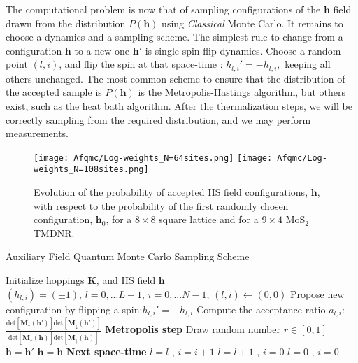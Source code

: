 The computational problem is now that of sampling configurations of the $\bm h$ field drawn from the distribution $P(\bm h)$ using \emph{Classical} Monte Carlo.
It remains to choose a dynamics and a sampling scheme. The simplest rule to change from a configuration $\bm h$ to a new one $\bm h'$ is single spin-flip dynamics. 
Choose a random point $(l, i)$, and flip the spin at that space-time  :
$
h_{l, i}' = - h_{l, i},
$
keeping all others unchanged.
The most common scheme to ensure that the distribution of the accepted sample is $P(\bm h)$ is the Metropolis-Hastings algorithm, but others exist, such as the heat bath algorithm.
After the thermalization steps, we will be correctly sampling from the required distribution, and we may perform measurements.
\begin{figure}[H]\label{fig:convergence}
\hspace{0.3cm}
\texttt{[image: Afqmc/Log-weights\_N=64sites.png]}
\hspace{0.3cm}
\texttt{[image: Afqmc/Log-weights\_N=108sites.png]}
\caption[Evolution of the probability of accepted configurations.]{Evolution of the probability of accepted HS field configurations, $\bm h$, with respect to the probability of the first randomly chosen configuration, $\bm h_0$, for a $8 \times 8$ square lattice and for a $9 \times 4$ $\text{Mo}\text{S}_2$ \acs{TMDNR}.}
\end{figure}
\begin{algorithm}
\caption{Auxiliary Field Quantum Monte Carlo Sampling Scheme}
\label{afqmcSampling}
\begin{algorithmic}[5]
  \STATE Initialize hoppings $\bm K$, and  HS field $\bm h$  \\
  \STATE  $(h_{l, i}) = (\pm 1)$, $ l=0,... L-1$, $i = 0, ... N-1$; $(l, i) \leftarrow (0, 0)$
  \STATE \footnotesize{Propose new configuration by flipping a spin:}\normalsize{$h_{l, i}' = - h_{l, i}$} 
  \STATE \footnotesize{Compute the acceptance ratio $a_{l, i}$}:
  \normalsize{$\frac{\text{det}[\bm M_\uparrow (\bm h')]\text{det}[\bm M_\downarrow (\bm h')]}{\text{det}[\bm M_\uparrow (\bm h)]\text{det}[\bm M_\downarrow (\bm h)]}$}
  \STATE \textbf{\normalsize{Metropolis step}}
  \STATE \footnotesize{Draw random number $r \in [0,1]$}
  \STATE $\bm h = \bm h'$
  \ELSE
  \STATE $\bm h = \bm h$
  \ENDIF
  \STATE \textbf{Next space-time }
  \STATE $l = l$ , $i = i +1 $
  \ELSE
  \STATE $l = l+1$ , $i = 0 $
  \ENDIF
  \STATE $l = 0$ , $i=0$
  \ENDIF
  \ENDIF
  \ENDFOR
\end{algorithmic}
\end{algorithm}

